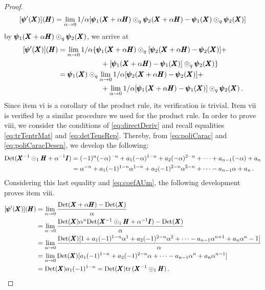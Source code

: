 {\begin{proof}
\begin{equation*}
[\pmb{\psi}'(\pmb{X})](\pmb{H})=\lim_{\alpha\to 0}1/\alpha[\pmb{\psi}_1(\pmb{X}+\alpha\pmb{H})\odot_q\pmb{\psi}_2(\pmb{X}+\alpha\pmb{H})-\pmb{\psi}_1(\pmb{X})\odot_q\pmb{\psi}_2(\pmb{X})]
\end{equation*}
by $\pmb{\psi}_1(\pmb{X}+\alpha\pmb{H})\odot_{q}\pmb{\psi}_2(\pmb{X})$, we arrive at
\begin{align*}
[\pmb{\psi}'(\pmb{X})](\pmb{H})&=\lim_{\alpha\to 0}1/\alpha\{ \pmb{\psi}_1(\pmb{X}+\alpha\pmb{H})\odot_{q}[\pmb{\psi}_2(\pmb{X}+\alpha\pmb{H})-\pmb{\psi}_2(\pmb{X})] +\\
& \qquad\qquad\qquad+[\pmb{\psi}_1(\pmb{X}+\alpha\pmb{H})-\pmb{\psi}_1(\pmb{X})]\odot_q\pmb{\psi}_2(\pmb{X})\}\\
&= \pmb{\psi}_1(\pmb{X})\odot_{q}\lim_{\alpha\to 0}1/\alpha[\pmb{\psi}_2(\pmb{X}+\alpha\pmb{H})-\pmb{\psi}_2(\pmb{X})] +\\
& \qquad\qquad\qquad+\lim_{\alpha\to 0}1/\alpha[\pmb{\psi}_1(\pmb{X}+\alpha\pmb{H})-\pmb{\psi}_1(\pmb{X})]\odot_q\pmb{\psi}_2(\pmb{X})\,.
\end{align*}
Since item vi is a corollary of the product rule, its verification is trivial. Item vii is verified by a similar procedure we used for the product rule. In order to prove viii, we consider the conditions of \eqref{eq:directDeriv} and recall equalities \eqref{eq:trTentrMat} and \eqref{eq:detTensRep}. Thereby, from \eqref{eq:poliCarac} and \eqref{eq:poliCaracDesen}, we develop the following:
\begin{align*}
\textnormal{Det}(\pmb{X}^{-1}\odot_1\pmb{H}+\alpha^{-1}\pmb{I})&=(-1)^n(-\alpha)^{-n}+a_1(-\alpha)^{1-n}+a_2(-\alpha)^{2-n}+\cdots+a_{n-1}(-\alpha)+a_n\\
&=\alpha^{-n}+a_1(-1)^{1-n}\alpha^{1-n}+a_2(-1)^{2-n}\alpha^{2-n}+\cdots-a_{n-1}\alpha+a_n\,.
\end{align*}
Considering this last equality and \eqref{eq:coefAUm}, the following development proves item viii.
\begin{align*}
[\pmb{\psi}'(\pmb{X})](\pmb{H})&=\lim_{\alpha\to 0} \dfrac{\textnormal{Det}(\pmb{X}+\alpha\pmb{H})-\textnormal{Det}(\pmb{X})}{\alpha}\\
&=\lim_{\alpha\to 0} \dfrac{\textnormal{Det}(\pmb{X})\alpha^n\textnormal{Det}(\pmb{X}^{-1}\odot_1\pmb{H}+\alpha^{-1}\pmb{I})-\textnormal{Det}(\pmb{X})}{\alpha}\\
&=\lim_{\alpha\to 0} \dfrac{\textnormal{Det}(\pmb{X})[1+a_1(-1)^{1-n}\alpha^1+a_2(-1)^{2-n}\alpha^2+\cdots-a_{n-1}\alpha^{n+1}+a_n\alpha^n-1]}{\alpha}\\
&=\lim_{\alpha\to 0} \textnormal{Det}(\pmb{X})[a_1(-1)^{1-n}+a_2(-1)^{2-n}\alpha+\cdots-a_{n-1}\alpha^n+a_n\alpha^{n-1}]\\
&=\textnormal{Det}(\pmb{X})a_1(-1)^{1-n} = \textnormal{Det}(\pmb{X})\mathrm{tr}\,(\pmb{X}^{-1}\odot_1\pmb{H})\,.
\end{align*}



\end{proof}}



